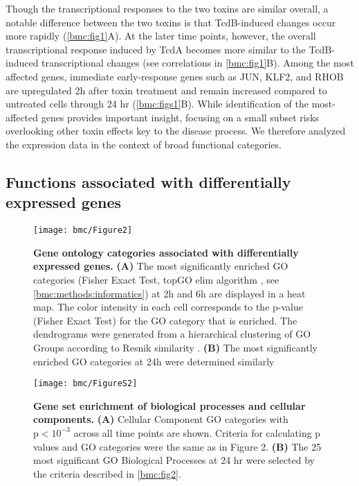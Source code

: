 Though the transcriptional responses to the two toxins 
are similar overall, a notable difference between the 
two toxins is that TcdB-induced changes occur more 
rapidly (\autoref{bmc:fig1}A). At the later time points, 
however, the overall transcriptional response induced by 
TcdA becomes more similar to the TcdB-induced transcriptional 
changes (see correlations in \autoref{bmc:fig1}B). Among 
the most affected genes, immediate early-response genes 
such as JUN, KLF2, and RHOB are upregulated 2h after toxin 
treatment and remain increased compared to untreated cells 
through 24 hr (\autoref{bmc:figs1}B). While identification 
of the most-affected genes provides important insight, 
focusing on a small subset risks overlooking other toxin 
effects key to the disease process. We therefore analyzed 
the expression data in the context of broad functional categories.

\subsection{Functions associated with differentially expressed genes}

\begin{figure}[h!]
  \centering
  \texttt{[image: bmc/Figure2]}
  \caption[Gene ontology categories associated with differentially expressed genes]{
  \textbf{Gene ontology categories associated with differentially expressed genes.}
  \textbf{(A)} The most significantly enriched GO categories 
  (Fisher Exact Test, topGO elim algorithm \cite{Alexa:2006hg}, 
  see \ref{bmc:methods:informatics}) at 2h and 6h are displayed 
  in a heat map. The color intensity in each cell corresponds to 
  the p-value (Fisher Exact Test) for the GO category that is 
  enriched. The dendrograms were generated from a hierarchical 
  clustering of GO Groups according to Resnik similarity \cite{Resnik:1999jl}.
  \textbf{(B)} The most significantly enriched GO 
  categories at 24h were determined similarly
}
  \label{bmc:fig2}
\end{figure}

\begin{figure}[h!]
  \centering
  \texttt{[image: bmc/FigureS2]}
  \caption[Gene set enrichment of biological processes and cellular components]{
  \textbf{Gene set enrichment of biological processes 
  and cellular components.}
  \textbf{(A)} Cellular Component GO categories 
  with $\text{p}<10^{-3}$ across all time points 
  are shown. Criteria for calculating p
  values and GO categories were the same 
  as in Figure 2.
  \textbf{(B)} The 25 most significant GO 
  Biological Processes at 24 hr were selected 
  by the criteria described in \autoref{bmc:fig2}.}
  \label{bmc:figs2}
\end{figure}


